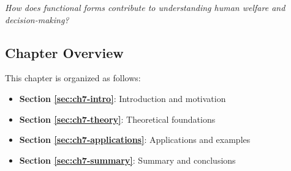 \begin{tcolorbox}[
    colback=red!5!white,
    colframe=red!75!black,
    title={\textbf{Central Question}},
    fonttitle=\bfseries
]
\Large
\centering
\textit{How does functional forms contribute to understanding human welfare and decision-making?}
\end{tcolorbox}



\subsection*{Chapter Overview}

This chapter is organized as follows:

\begin{itemize}
\item \textbf{Section \ref{sec:ch7-intro}}: Introduction and motivation
\item \textbf{Section \ref{sec:ch7-theory}}: Theoretical foundations
\item \textbf{Section \ref{sec:ch7-applications}}: Applications and examples
\item \textbf{Section \ref{sec:ch7-summary}}: Summary and conclusions
\end{itemize}




